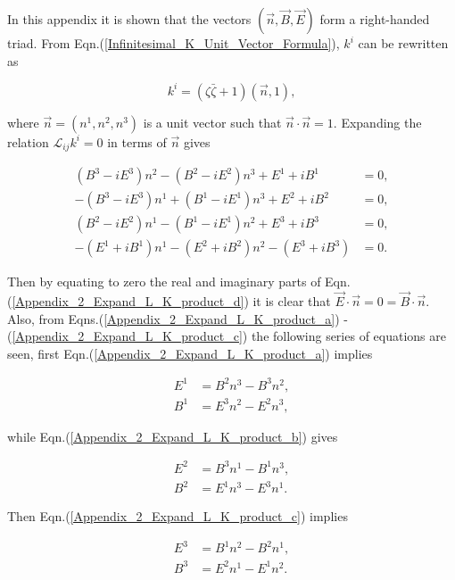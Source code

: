 \begin{appendix}
In this appendix it is shown that the vectors $(\vec{n}, \vec{B}, \vec{E})$ form a right-handed triad. From Eqn.(\ref{Infinitesimal_K_Unit_Vector_Formula}), $k^i$ can be rewritten as

\begin{equation*}
k^i = (\zeta \bar{\zeta} + 1)(\vec{n}, 1),
\end{equation*}

\noindent where $\vec{n} = (n^1, n^2, n^3)$ is a unit vector such that $\vec{n} \cdot \vec{n} = 1$. Expanding the relation $\mathcal{L}_{ij} k^i = 0$ in terms of $\vec{n}$ gives

\begin{subequations}
\begin{align}
\label{Appendix_2_Expand_L_K_product_a}
(B^3 - i E^3)n^2 - (B^2 - i E^2)n^3 + E^1 + iB^1 & = 0, 
\\\label{Appendix_2_Expand_L_K_product_b}
-(B^3 - i E^3)n^1 + (B^1 - i E^1)n^3 + E^2 + iB^2 & = 0, 
\\\label{Appendix_2_Expand_L_K_product_c}
(B^2 - i E^2)n^1 - (B^1 - i E^1)n^2 + E^3 + iB^3 & = 0, 
\\\label{Appendix_2_Expand_L_K_product_d}
-(E^1 + i B^1)n^1 - (E^2 + iB^2)n^2 - (E^3 + iB^3) & = 0.
\end{align}
\end{subequations}

\noindent Then by equating to zero the real and imaginary parts of Eqn.(\ref{Appendix_2_Expand_L_K_product_d}) it is clear that  $\vec{E} \cdot \vec{n} = 0 = \vec{B} \cdot \vec{n}$. Also, from Eqns.(\ref{Appendix_2_Expand_L_K_product_a}) - (\ref{Appendix_2_Expand_L_K_product_c}) the following series of equations are seen, first Eqn.(\ref{Appendix_2_Expand_L_K_product_a}) implies

\begin{align*}
E^1 & = B^2 n^3 - B^3 n^2, \\
B^1 & = E^3 n^2 - E^2 n^3, 
\end{align*}

\noindent while Eqn.(\ref{Appendix_2_Expand_L_K_product_b}) gives

\begin{align*} 
E^2 & = B^3 n^1 - B^1n^3, \\
B^2 & = E^1 n^3 - E^3 n^1.
\end{align*} 

\noindent Then Eqn.(\ref{Appendix_2_Expand_L_K_product_c}) implies

\begin{align*}
E^3 & = B^1 n^2 - B^2 n^1,\\
B^3 & = E^2 n^1 - E^1 n^2.
\end{align*}


\end{appendix}
